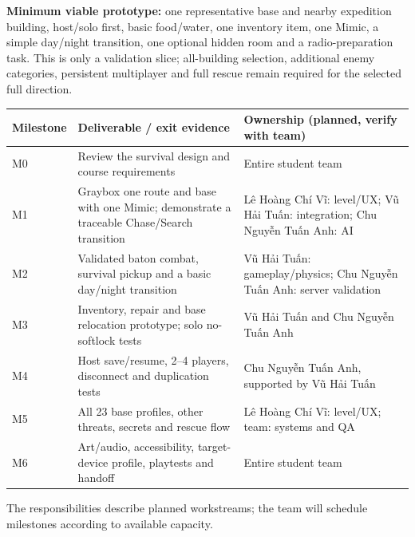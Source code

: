 \textbf{Minimum viable prototype:} one representative base and nearby expedition building, host/solo first, basic food/water, one inventory item, one Mimic, a simple day/night transition, one optional hidden room and a radio-preparation task. This is only a validation slice; all-building selection, additional enemy categories, persistent multiplayer and full rescue remain required for the selected full direction.

\begin{longtable}{@{}p{}p{}p{}@{}}
\toprule
\textbf{Milestone} & \textbf{Deliverable / exit evidence} & \textbf{Ownership (planned, verify with team)} \\ \midrule\endhead
M0 & Review the survival design and course requirements & Entire student team \\
M1 & Graybox one route and base with one Mimic; demonstrate a traceable Chase/Search transition & Lê Hoàng Chí Vĩ: level/UX; Vũ Hải Tuấn: integration; Chu Nguyễn Tuấn Anh: AI \\
M2 & Validated baton combat, survival pickup and a basic day/night transition & Vũ Hải Tuấn: gameplay/physics; Chu Nguyễn Tuấn Anh: server validation \\
M3 & Inventory, repair and base relocation prototype; solo no-softlock tests & Vũ Hải Tuấn and Chu Nguyễn Tuấn Anh \\
M4 & Host save/resume, 2--4 players, disconnect and duplication tests & Chu Nguyễn Tuấn Anh, supported by Vũ Hải Tuấn \\
M5 & All 23 base profiles, other threats, secrets and rescue flow & Lê Hoàng Chí Vĩ: level/UX; team: systems and QA \\
M6 & Art/audio, accessibility, target-device profile, playtests and handoff & Entire student team \\
\bottomrule
\end{longtable}
The responsibilities describe planned workstreams; the team will schedule milestones according to available capacity.


